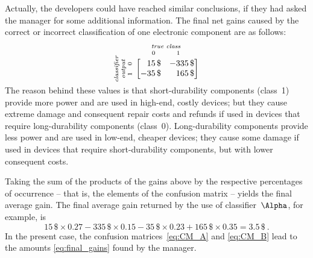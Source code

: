 \documentclass[\ifafour a4paper,12pt,\else a5paper,10pt,\fi%
onecolumn,oneside,article,%
british%
]{memoir}
\theoremstyle{remark}
\theoremstyle{innote}
\renewcommand*{\|}[1][]{\nonscript\:#1\vert\nonscript\:\mathopen{}}
\renewcommand*{\texteuro}{\$}
\newcommand*{\umatrix}[4]{\begin{bmatrix*}[r]#1&#2\\#3&#4\end{bmatrix*}}
\begin{document}
Actually, the developers could have reached similar conclusions, if they had asked the manager for some additional information. The final net gains caused by the correct or incorrect classification of one electronic component are as follows:
\begin{equation}
  \label{eq:utility_example}
  \rotatebox[origin=c]{90}{
    \clap{\textit{\parbox{5em}{\centering\scriptsize classifier\\output\\$1\quad 0$}}
    }}\ 
    \overbracket[0pt]{
      \umatrix{
        15\,\text{\texteuro} }{ -335\,\text{\texteuro} }{
        -35\,\text{\texteuro} }{ 165\,\text{\texteuro}}
      }^{
      \clap{\textit{\parbox{6em}{\centering\scriptsize true class\\$0\hspace{3em}1$}}
    }}
\end{equation}
The reason behind these values is that short-durability components (class~1) provide more power and are used in high-end, costly devices; but they cause extreme damage and consequent repair costs and refunds if used in devices that require long-durability components (class~0). Long-durability components provide less power and are used in low-end, cheaper devices; they cause some damage if used in devices that require short-durability components, but with lower consequent costs.

Taking the sum of the products of the gains above by the respective percentages of occurrence -- that is, the elements of the confusion matrix -- yields the final average gain. The final average gain returned by the use of classifier~$\Alpha$, for example, is
\begin{equation*}
  15\,\text{\texteuro} \times 0.27 
  -335\,\text{\texteuro} \times 0.15 
  -35\,\text{\texteuro} \times 0.23 
  + 165\,\text{\texteuro} \times 0.35 =
  3.5 \,\text{\texteuro} \ .
\end{equation*}
In the present case, the confusion matrices~\eqref{eq:CM_A} and \eqref{eq:CM_B} lead to the amounts \eqref{eq:final_gains} found by the manager.


\end{document}
